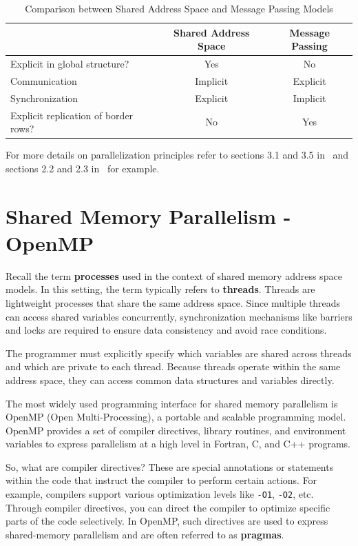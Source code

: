 \documentclass[12pt]{book}
\begin{document}
\begin{table}[H]
    \centering
    \begin{tabular}{|p{}|c|c|}
        \hline
        & \textbf{Shared Address Space} & \textbf{Message Passing} \\
        \hline
        Explicit in global structure? & Yes & No \\
        Communication                 & Implicit & Explicit \\
        Synchronization               & Explicit & Implicit \\
        Explicit replication of border rows? & No & Yes \\
        \hline
    \end{tabular}
    \caption{Comparison between Shared Address Space and Message Passing Models}
    \label{tab:finsummary}
\end{table}
For more details on parallelization principles refer to sections 3.1 and 3.5 in~\cite{kumar1994introduction} and sections 2.2 and 2.3 in~\cite{culler1998parallel} for example.

\chapter{Shared Memory Parallelism - OpenMP}

Recall the term \textbf{processes} used in the context of shared memory address space models. In this setting, the term typically refers to \textbf{threads}. Threads are lightweight processes that share the same address space. Since multiple threads can access shared variables concurrently, synchronization mechanisms like barriers and locks are required to ensure data consistency and avoid race conditions.

The programmer must explicitly specify which variables are shared across threads and which are private to each thread. Because threads operate within the same address space, they can access common data structures and variables directly.

The most widely used programming interface for shared memory parallelism is OpenMP (Open Multi-Processing), a portable and scalable programming model. OpenMP provides a set of compiler directives, library routines, and environment variables to express parallelism at a high level in Fortran, C, and C++ programs.

So, what are compiler directives? These are special annotations or statements within the code that instruct the compiler to perform certain actions. For example, compilers support various optimization levels like \texttt{-O1}, \texttt{-O2}, etc. Through compiler directives, you can direct the compiler to optimize specific parts of the code selectively. In OpenMP, such directives are used to express shared-memory parallelism and are often referred to as \textbf{pragmas}.
\end{document}
